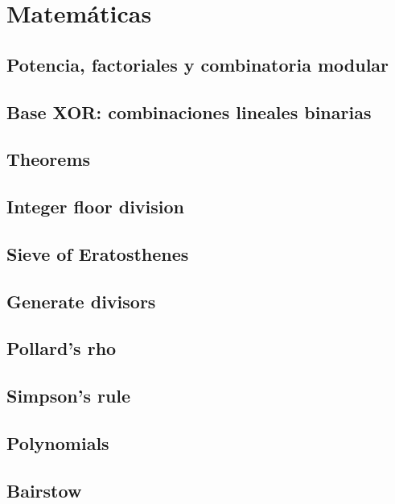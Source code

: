\section{Matemáticas}

\subsection{Potencia, factoriales y combinatoria modular}
\subsection{Base XOR: combinaciones lineales binarias}
\subsection{Theorems}
\subsection{Integer floor division}
\subsection{Sieve of Eratosthenes}
\subsection{Generate divisors}
\subsection{Pollard's rho}
\subsection{Simpson's rule}
\subsection{Polynomials}
\subsection{Bairstow}
